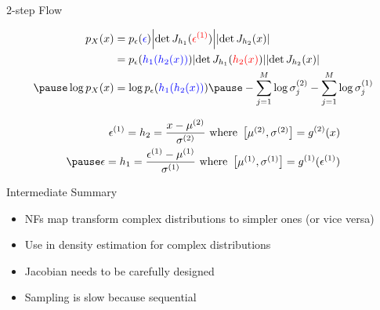 \begin{frame}{2-step Flow}
\begin{small}
\begin{equation*}
\begin{aligned}
p_{X}(x) &= p_{\epsilon}(\textcolor{blue}{\epsilon})\djac{h_{1}}{\textcolor{red}{\epsilon^{(1)}}}\djac{h_{2}}{x} \\
&= p_{\epsilon}(\textcolor{blue}{h_{1}(h_{2}(x))})\djac{h_{1}}{\textcolor{red}{h_{2}(x)}}\djac{h_{2}}{x} \\ \pause
\log p_{X}(x) &= \log p_{\epsilon}(\textcolor{blue}{h_{1}(h_{2}(x))})\pause -\sum_{j=1}^{M}\log\sigma^{(2)}_{j}-\sum_{j=1}^{M}\log\sigma^{(1)}_{j}
\end{aligned}
\end{equation*}
\end{small}
\pause
\begin{equation*}
\begin{aligned}
\epsilon^{(1)} = h_{2} = \frac{x - \mu^{(2)}}{\sigma^{(2)}} \text{ where } \begin{bmatrix}\mu^{(2)}, \sigma^{(2)}\end{bmatrix} = g^{(2)}(x) \\ \pause
\epsilon = h_{1} = \frac{\epsilon^{(1)} - \mu^{(1)}}{\sigma^{(1)}} \text{ where } \begin{bmatrix}\mu^{(1)}, \sigma^{(1)}\end{bmatrix} = g^{(1)}(\epsilon^{(1)})
\end{aligned}
\end{equation*}
\end{frame}

\begin{frame}{Intermediate Summary}
\begin{itemize}
\item NFs map transform complex distributions to simpler ones (or vice versa)
\item Use in density estimation for complex distributions
\item Jacobian needs to be carefully designed
\item Sampling is slow because sequential
\end{itemize}
\end{frame}


